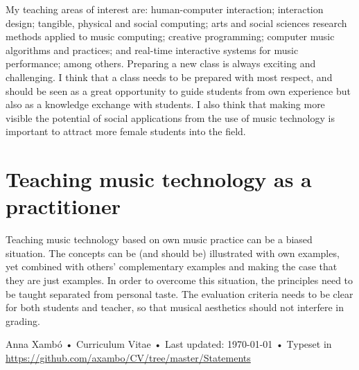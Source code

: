 \documentclass[10pt, a4paper]{article}
\begin{document}
My teaching areas of interest are: human-computer interaction; interaction design; tangible, physical and social computing; arts and social sciences research methods applied to music computing; creative programming; computer music algorithms and practices; and real-time interactive systems for music performance; among others. Preparing a new class is always exciting and challenging. I think that a class needs to be prepared with most respect, and should be seen as a great opportunity to guide students from own experience but also as a knowledge exchange with students. I also think that making more visible the potential of social applications from the use of music technology is important to attract more female students into the field.

\section*{Teaching music technology as a practitioner}

Teaching music technology based on own music practice can be a biased situation. The concepts can be (and should be) illustrated with own examples, yet combined with others' complementary examples and making the case that they are just examples. In order to overcome this situation, the principles need to be taught separated from personal taste. The evaluation criteria needs to be clear for both students and teacher, so that musical aesthetics should not interfere in grading. 

\vfill{}

\begin{center}
{\scriptsize  Anna Xambó •\- Curriculum Vitae •\- Last updated: \today\- •\- %
Typeset in \href{http://nitens.org/taraborelli/cvtex}{
\XeTeX }\\
\href{https://github.com/axambo/CV/tree/master/Statements}{https://github.com/axambo/CV/tree/master/Statements}}
\end{center}
\end{document}
